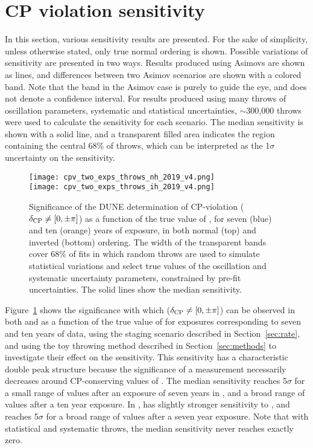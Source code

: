 \section{CP violation sensitivity}
\label{sec:cp_sens}

In this section, various sensitivity results are presented. For the sake of simplicity, unless otherwise stated, only true normal ordering is shown. Possible variations of sensitivity are presented in two ways. Results produced using Asimovs are shown as lines, and differences between two Asimov scenarios are shown with a colored band. Note that the band in the Asimov case is purely to guide the eye, and does not denote a confidence interval. For results produced using many throws of oscillation parameters, systematic and statistical uncertainties, $\sim$300,000 throws were used to calculate the sensitivity for each scenario. The median sensitivity is shown with a solid line, and a transparent filled area indicates the region containing the central 68\% of throws, which can be interpreted as the 1$\sigma$ uncertainty on the sensitivity.

\begin{figure}[htbp]
  \centering
  \texttt{[image: cpv\_two\_exps\_throws\_nh\_2019\_v4.png]}\\
  \texttt{[image: cpv\_two\_exps\_throws\_ih\_2019\_v4.png]}
  \caption[Significance of the DUNE determination of CP-violation as a function of \deltacp in both  and ]{Significance of the DUNE determination of CP-violation ($\delta_{\rm CP} \neq [0,\pm\pi]$) as a function of the true value of \deltacp, for seven (blue) and ten (orange) years of exposure, in both normal (top) and inverted (bottom) ordering. The width of the transparent bands cover 68\% of fits in which random throws are used to simulate statistical variations and select true values of the oscillation and systematic uncertainty parameters, constrained by pre-fit uncertainties. The solid lines show the median sensitivity.}
  \label{fig:cpv_nominal}
\end{figure}
Figure~\ref{fig:cpv_nominal} shows the significance with which  ($\delta_{\rm CP} \neq [0, \pm\pi]$) can be observed in both  and  as a
function of the true value of \deltacp for exposures corresponding to seven and ten years of data, using the staging scenario described in Section~\ref{sec:rate}, and using the toy throwing method described in Section~\ref{sec:methods} to investigate their effect on the sensitivity.
This sensitivity has a characteristic double peak
structure because the significance of a  measurement
necessarily decreases around CP-conserving values of \deltacp.
The median  sensitivity reaches 5$\sigma$ for a small range of values after an exposure of seven years in , and a broad range of values after a ten year exposure. In ,  has slightly stronger sensitivity to , and reaches 5$\sigma$ for a broad range of values after a seven year exposure.
Note that with statistical and systematic throws, the median sensitivity never reaches exactly zero.


